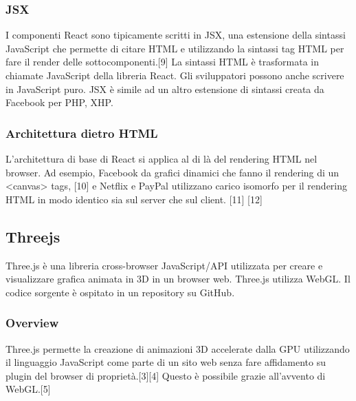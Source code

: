 \subsubsection{JSX}
I componenti React sono tipicamente scritti in JSX, una estensione della sintassi JavaScript che permette di citare
HTML e utilizzando la sintassi tag HTML per fare  il render delle sottocomponenti.[9]
La sintassi HTML è trasformata in chiamate JavaScript
della libreria React. Gli sviluppatori possono anche scrivere in JavaScript puro. JSX è simile ad un altro
estensione di sintassi creata da Facebook per PHP, XHP.

\subsubsection{Architettura dietro HTML}
L'architettura di base di React si applica al di là del rendering HTML nel browser. Ad esempio, Facebook
da grafici dinamici che fanno il rendering di un <canvas> tags, [10] e Netflix e PayPal utilizzano carico isomorfo per
il rendering HTML in modo identico sia sul server che sul client. [11] [12]


\newpage
\subsection{Threejs}
\label{sec:chapter_2_section_3_sub_2}
Three.js \`e una libreria cross-browser JavaScript/API utilizzata per creare e visualizzare grafica animata in 3D
in un browser web. Three.js utilizza WebGL. Il codice sorgente è ospitato in un repository su GitHub.

\subsubsection{Overview}
Three.js permette la creazione di animazioni 3D accelerate dalla GPU utilizzando il linguaggio JavaScript
come parte di un sito web senza fare affidamento su plugin del browser di proprietà.[3][4]
 Questo è possibile grazie all'avvento di WebGL.[5]

